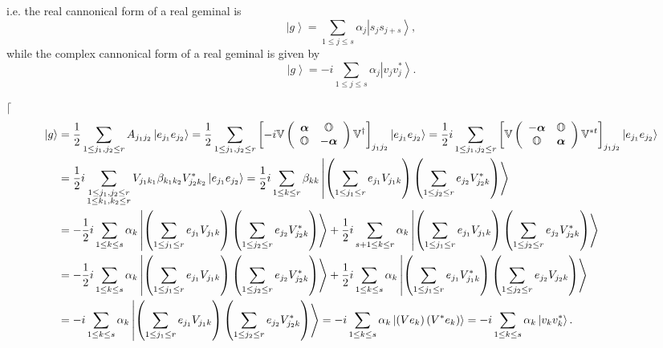 \documentclass[aps,preprint]{revtex4}%
\begin{document}
i.e. the real cannonical form of a real geminal is
\begin{equation}
\left\vert g\right\rangle =\sum\limits_{1\leq j\leq s}\alpha_{j}\left\vert
s_{j}s_{j+s}\right\rangle ,
\end{equation}
while the complex cannonical form of a real geminal is given by
\begin{equation}
\left\vert g\right\rangle =-i\sum_{1\leq j\leq s}\alpha_{j}\left\vert
v_{j}v_{j}^{\ast}\right\rangle .
\end{equation}


$\lceil$%
\begin{align}
\left\vert g\right\rangle  &  =\frac{1}{2}\sum_{1\leq j_{1},j_{2}\leq
r}A_{j_{1}j_{2}}\left\vert e_{j_{1}}e_{j_{2}}\right\rangle =\frac{1}{2}%
\sum_{1\leq j_{1},j_{2}\leq r}\left[  -i\mathbb{V}\left(
\begin{array}
[c]{cc}%
\boldsymbol{\alpha} & \mathbb{O}\\
\mathbb{O} & -\boldsymbol{\alpha}%
\end{array}
\right)  \mathbb{V}^{\dagger}\right]  _{j_{1}j_{2}}\left\vert e_{j_{1}%
}e_{j_{2}}\right\rangle =\frac{1}{2}i\sum_{1\leq j_{1},j_{2}\leq r}\left[
\mathbb{V}\left(
\begin{array}
[c]{cc}%
-\boldsymbol{\alpha} & \mathbb{O}\\
\mathbb{O} & \boldsymbol{\alpha}%
\end{array}
\right)  \mathbb{V}^{\ast t}\right]  _{j_{1}j_{2}}\left\vert e_{j_{1}}%
e_{j_{2}}\right\rangle \\
&  =\frac{1}{2}i\sum_{\substack{1\leq j_{1},j_{2}\leq r\\1\leq k_{1},k_{2}\leq
r}}V_{j_{1}k_{1}}\mathbf{\beta}_{k_{1}k_{2}}V_{j_{2}k_{2}}^{\ast}\left\vert
e_{j_{1}}e_{j_{2}}\right\rangle =\frac{1}{2}i\sum_{1\leq k\leq r}%
\mathbf{\beta}_{kk}\left\vert \left(  \sum_{1\leq j_{1}\leq r}e_{j_{1}%
}V_{j_{1}k}\right)  \left(  \sum_{1\leq j_{2}\leq r}e_{j_{2}}V_{j_{2}k}^{\ast
}\right)  \right\rangle \\
&  =-\frac{1}{2}i\sum_{1\leq k\leq s}\alpha_{k}\left\vert \left(  \sum_{1\leq
j_{1}\leq r}e_{j_{1}}V_{j_{1}k}\right)  \left(  \sum_{1\leq j_{2}\leq
r}e_{j_{2}}V_{j_{2}k}^{\ast}\right)  \right\rangle +\frac{1}{2}i\sum_{s+1\leq
k\leq r}\alpha_{k}\left\vert \left(  \sum_{1\leq j_{1}\leq r}e_{j_{1}}%
V_{j_{1}k}\right)  \left(  \sum_{1\leq j_{2}\leq r}e_{j_{2}}V_{j_{2}k}^{\ast
}\right)  \right\rangle \\
&  =-\frac{1}{2}i\sum_{1\leq k\leq s}\alpha_{k}\left\vert \left(  \sum_{1\leq
j_{1}\leq r}e_{j_{1}}V_{j_{1}k}\right)  \left(  \sum_{1\leq j_{2}\leq
r}e_{j_{2}}V_{j_{2}k}^{\ast}\right)  \right\rangle +\frac{1}{2}i\sum_{1\leq
k\leq s}\alpha_{k}\left\vert \left(  \sum_{1\leq j_{1}\leq r}e_{j_{1}}%
V_{j_{1}k}^{\ast}\right)  \left(  \sum_{1\leq j_{2}\leq r}e_{j_{2}}V_{j_{2}%
k}\right)  \right\rangle \\
&  =-i\sum_{1\leq k\leq s}\alpha_{k}\left\vert \left(  \sum_{1\leq j_{1}\leq
r}e_{j_{1}}V_{j_{1}k}\right)  \left(  \sum_{1\leq j_{2}\leq r}e_{j_{2}%
}V_{j_{2}k}^{\ast}\right)  \right\rangle =-i\sum_{1\leq k\leq s}\alpha
_{k}\left\vert \left(  Ve_{k}\right)  \left(  V^{\ast}e_{k}\right)
\right\rangle =-i\sum_{1\leq k\leq s}\alpha_{k}\left\vert v_{k}v_{k}^{\ast
}\right\rangle .
\end{align}
\end{document}
